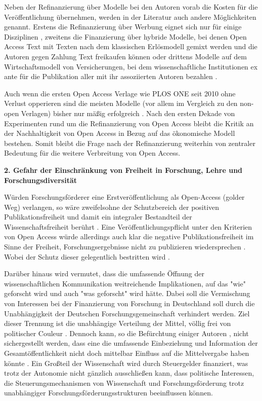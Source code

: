 Neben der Refinanzierung über Modelle bei den Autoren vorab die Kosten für die Veröffentlichung übernehmen, werden in der Literatur auch andere Möglichkeiten genannt. Erstens die Refinanzierung über Werbung eignet sich nur für einige Disziplinen \cite{bjork_2004_open}, zweitens die Finanzierung über hybride Modelle, bei denen Open Access Text mit Texten nach dem klassischen Erlösmodell gemixt werden und die Autoren gegen Zahlung Text freikaufen können \cite{bjork_2012_hybrid} oder drittens Modelle auf dem Wirtschaftsmodell von Versicherungen, bei dem wissenschaftliche Institutionen ex ante für die Publikation aller mit ihr assoziierten Autoren bezahlen \cite[:63]{mueller-langer_2010}.

Auch wenn die ersten Open Access Verlage wie PLOS ONE seit 2010 ohne Verlust opperieren \cite{Jerram_2010} sind die meisten Modelle (vor allem im Vergleich zu den non-open Verlagen) bisher nur mäßig erfolgreich \cite{bjork_2012_hybrid}. Nach den ersten Dekade von Experimenten rund um die Refinanzierung von Open Access bleibt die Kritik an der Nachhaltigkeit von Open Access in Bezug auf das ökonomische Modell bestehen. Somit bleibt die Frage nach der Refinanzierung weiterhin von zentraler Bedeutung für die weitere Verbreitung von Open Access.

\textbf{2. Gefahr der Einschränkung von Freiheit in Forschung, Lehre und Forschungsdiversität}

Würden Forschungsförderer eine Erstveröffentlichung als Open-Access (golder Weg) verlangen, so wäre zweifelsohne der Schutzbereich der positiven Publikationsfreiheit und damit ein integraler Bestandteil der Wissenschaftsfreiheit berührt \cite[:191]{Fehling_2014}. Eine Veröffentlichungspflicht unter den Kriterien von Open Access würde allerdings auch klar die negative Publikationsfreiheit im  Sinne der Freiheit, Forschungsergebnisse nicht zu publizieren wiedersprechen \cite[:192]{Fehling_2014}. Wobei der Schutz dieser gelegentlich bestritten wird \cite[:192]{Fehling_2014}.

Darüber hinaus wird vermutet, dass die umfassende Öffnung der wissenschaftlichen Kommunikation weitreichende Implikationen, auf das "wie" geforscht wird und auch "was geforscht" wird \cite{suchen} hätte. Dabei soll die Vermischung von Interessen bei der Finanzierung von Forschung in Deutschland soll durch die Unabhängigkeit der Deutschen Forschungsgemeinschaft verhindert werden. Ziel dieser Trennung ist die unabhängige Verteilung der Mittel, völlig frei von politischer Couleur \cite{suchen}. Dennoch kann, so die Befürchtung einiger Autoren \cite{suchen}, nicht sichergestellt werden, dass eine die umfassende Einbeziehung und Information der Gesamtöffentlichkeit nicht doch mittelbar Einfluss auf die Mittelvergabe haben könnte \cite{weingart_2005_wissenschaft}. Ein Großteil der Wissenschaft wird durch Steuergelder finanziert, was trotz der Autonomie nicht gänzlich ausschließen kann, dass politische Interessen, die Steuerungsmechanismen von Wissenschaft und Forschungsförderung trotz unabhängiger Forschungsförderungsstrukturen beeinflussen können.

